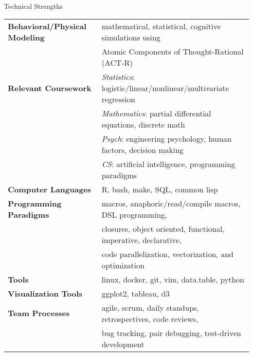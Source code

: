 

\begin{rSection}{Technical Strengths}
  \begin{tabular}{ @{} >{\bfseries}l @{\hspace{4ex}} l }
    Behavioral/Physical Modeling &	mathematical, statistical, cognitive simulations using \\
    &					Atomic Components of Thought-Rational (ACT-R) \\
    [.13cm]
    Relevant Coursework &		\emph{Statistics}: logistic/linear/nonlinear/multivariate regression \\
    &					\emph{Mathematics}: partial differential equations, discrete math \\
    &					\emph{Psych}: engineering psychology, human factors, decision making \\ 
    &					\emph{CS}: artificial intelligence, programming paradigms \\
    [.13cm]
    Computer Languages &		R, bash, make, SQL, common lisp \\
    [.13cm]
    Programming Paradigms &		macros, anaphoric/read/compile macros, DSL programming, \\
    & 					closures, object oriented, functional, imperative, declarative, \\
    &					code parallelization, vectorization, and optimization \\
    [.13cm]
    Tools & 				linux, docker, git, vim, data.table, python \\
    [.13cm]
    Visualization Tools &		ggplot2, tableau, d3 \\
    [.13cm]
    Team Processes & 			agile, scrum, daily standups, retrospectives, code reviews, \\
    & 					bug tracking, pair debugging, test-driven development \\
  \end{tabular}
\end{rSection}


